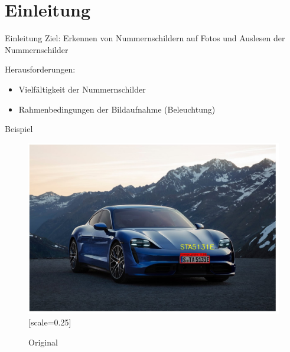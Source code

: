 \section{Einleitung}

\begin{frame}{Einleitung}
    Ziel: Erkennen von Nummernschildern auf Fotos und Auslesen der Nummernschilder
    
    Herausforderungen:
    \begin{itemize}
        \item Vielfältigkeit der Nummernschilder
        \item Rahmenbedingungen der Bildaufnahme (Beleuchtung)
    \end{itemize}
\end{frame}

\begin{frame}{Beispiel}
  \begin{figure}
  \begin{center}
   \includegraphics{Bild2}[scale=0.25]
   \caption{Original}
   \label{Original}
\end{center}
\end{figure}
 
\end{frame}
